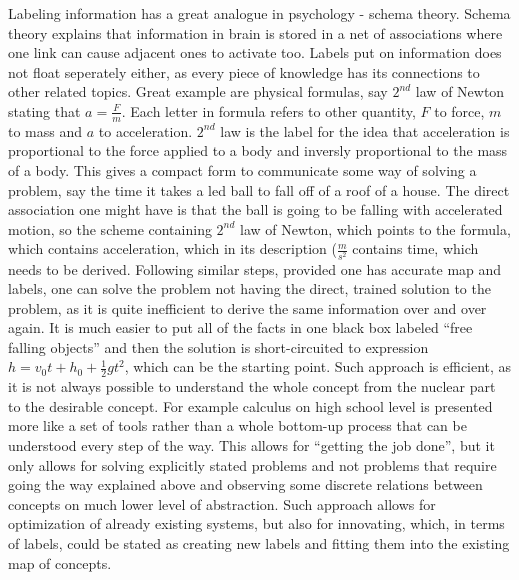 \documentclass{report}
\begin{document}
Labeling information has a great analogue in psychology - schema theory. Schema theory explains that information in brain is stored
in a net of associations where one link can cause adjacent ones to activate too. Labels put on information does not float seperately 
either, as every piece of knowledge has its connections to other related topics. Great example are physical formulas, say $2^{nd}$ law of 
Newton stating that $a = \frac{F}{m}$. Each letter in formula refers to other quantity, $F$ to force, $m$ to mass and $a$ to acceleration. $2^{nd}$ 
law is the label for the idea that acceleration is proportional to the force applied to a body and inversly proportional to the mass of a body.
This gives a compact form to communicate some way of solving a problem, say the time it takes a led ball to fall off of a roof of a house.
The direct association one might have is that the ball is going to be falling with accelerated motion, so the scheme containing $2^{nd}$ law
of Newton, which points to the formula, which contains acceleration, which in its description ($\frac{m}{s^2}$ contains time, which needs to be
derived. Following similar steps, provided one has accurate map and labels, one can solve the problem not having the direct, trained solution to the
problem, as it is quite inefficient to derive the same information over and over again. It is much easier to put all of the facts in one black box labeled
``free falling objects'' and then the solution is short-circuited to expression $h = v_0t + h_0 + \frac{1}{2}gt^2$, which can be the starting point. Such 
approach is efficient, as it is not always possible to understand the whole concept from the nuclear part to the desirable concept. For example calculus on 
high school level is presented more like a set of tools rather than a whole bottom-up process that can be understood every step of the way. This allows 
for ``getting the job done'', but it only allows for solving explicitly stated problems and not problems that require going the way explained above and 
observing some discrete relations between concepts on much lower level of abstraction. Such approach allows for optimization of already existing systems, but 
also for innovating, which, in terms of labels, could be stated as creating new labels and fitting them into the existing map of concepts. \\
\end{document}
